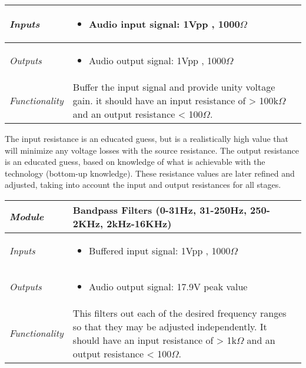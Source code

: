 \begin{enumerate}
\begin{onlysolution}
\begin{tabular}{|l|m{10cm}|}
\emph{Inputs} & 
\begin{itemize}
\item Audio input signal: 1Vpp , 1000$\Omega$
\end{itemize} \\ \hline

\emph{Outputs} & 
\begin{itemize}
\item Audio output signal: 1Vpp , 1000$\Omega$
\end{itemize}  \\ \hline

\emph{Functionality} & 
Buffer the input signal and provide unity voltage gain. it should have an
input resistance of > 100k$\Omega$ and an output resistance < 100$\Omega$. \\ \hline
\end{tabular}

The input resistance is an educated guess, but is a realistically high value that will
minimize any voltage losses with the source resistance. The output resistance is
an educated guess, based on knowledge of what is achievable with the technology
(bottom-up knowledge). These resistance values are later refined and adjusted,
taking into account the input and output resistances for all stages.

\begin{tabular}{|l|m{10cm}|}
\hline
\emph{Module} & Bandpass Filters (0-31Hz, 31-250Hz, 250-2KHz, 2kHz-16KHz)\\ \hline

\emph{Inputs} & 
\begin{itemize}
\item Buffered input signal: 1Vpp , 1000$\Omega$
\end{itemize} \\ \hline

\emph{Outputs} & 
\begin{itemize}
\item Audio output signal: 17.9V peak value
\end{itemize}  \\ \hline

\emph{Functionality} & 
This filters out each of the desired frequency ranges so that they may be
adjusted independently. It should have an input resistance of > 1k$\Omega$ 
and an output resistance < 100$\Omega$. \\ \hline
\end{tabular}




\end{onlysolution}
\end{enumerate}
